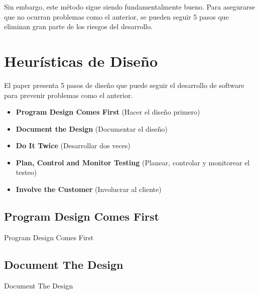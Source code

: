 \documentclass{beamer}
\begin{document}
\begin{frame}[fragile]

Sin embargo, este método sigue siendo fundamentalmente bueno. Para asegurarse que no ocurran problemas como el anterior, se pueden seguir 5 pasos que eliminan gran parte de los riesgos del desarrollo.

\end{frame}

\section{Heurísticas de Diseño}

\begin{frame}
El paper presenta 5 pasos de diseño que puede seguir el desarrollo de software para prevenir problemas como el anterior.

\begin{itemize}
\item<2-> \textbf{Program Design Comes First} (Hacer el diseño primero)
\item<3-> \textbf{Document the Design} (Documentar el diseño)
\item<4-> \textbf{Do It Twice} (Desarrollar dos veces)
\item<5-> \textbf{Plan, Control and Monitor Testing} (Planear, controlar y monitorear el testeo)
\item<6-> \textbf{Involve the Customer} (Involucrar al cliente)
\end{itemize}

\end{frame}

\subsection{Program Design Comes First}

\begin{frame}{Program Design Comes First}

\end{frame}

\subsection{Document The Design}

\begin{frame}{Document The Design}

\end{frame}
\end{document}
